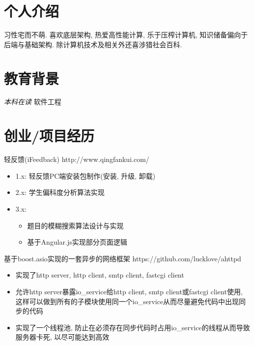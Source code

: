 \documentclass{resume}
\begin{document}



\section{\faUser 个人介绍}
习性宅而不萌.
\newline
喜欢底层架构, 热爱高性能计算, 乐于压榨计算机, 知识储备偏向于后端与基础架构.
\newline
除计算机技术及相关外还喜涉猎社会百科.

\section{\faGraduationCap 教育背景}
\textit{本科在读} 软件工程

\section{\faStar 创业/项目经历}
\begin{onehalfspacing}
轻反馈(iFeedback)
\newline
http://www.qingfankui.com/
\begin{itemize}
  \item 1.x: 轻反馈PC端安装包制作(安装, 升级, 卸载)
  \item 2.x: 学生偏科度分析算法实现
  \item 3.x:
  \begin{itemize} 
    \item 题目的模糊搜索算法设计与实现 
    \item 基于Angular.js实现部分页面逻辑
  \end{itemize}
\end{itemize}
\end{onehalfspacing}

\begin{onehalfspacing}
基于boost.asio实现的一套异步的网络框架
\newline
https://github.com/lucklove/ahttpd
\begin{itemize}
  \item 实现了http server, http client, smtp client, fastcgi client
  \item 允许http server暴露io\_service给http client, smtp client或fastcgi client使用, 这样可以做到所有的子模块使用同一个io\_service从而尽量避免代码中出现同步的代码
  \item 实现了一个线程池, 防止在必须存在同步代码时占用io\_service的线程从而导致服务器卡死, 以尽可能达到高效
\end{itemize}
\end{onehalfspacing}
\end{document}
